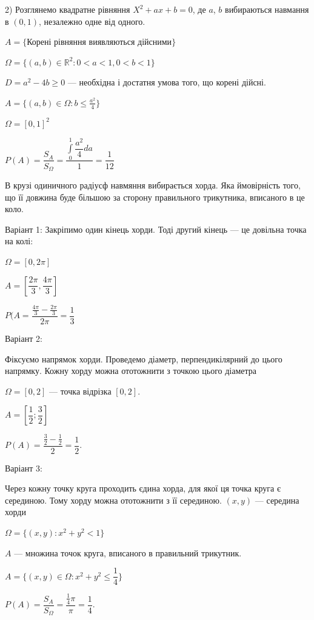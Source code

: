 2) Розглянемо квадратне рівняння $X^2 + ax + b = 0$, де $a$, $b$ вибираються
навмання в $(0, 1)$, незалежно одне від одного.

$A = \{$Корені рівняння виявляються дійсними$\}$

$\Omega = \{ (a, b) \in \mathbb{R}^2: 0 < a < 1, 0 < b < 1\}$

$D = a^2 - 4b \geqslant 0$ --- необхідна і достатня умова того, що корені дійсні.

$A = \{(a, b) \in \Omega: b \leqslant \frac{a^2}{4}\}$

\beautifulImage

$\Omega = [0, 1]^2$

$P(A) = \dfrac{S_A}{S_{\Omega}}
= \dfrac{\int\limits_0^1 \dfrac{a^2}{4}da}{1}
= \dfrac{1}{12}$

\begin{problem}    
    В крузі одиничного радіусф навмяння вибирається хорда.
    Яка ймовірність того, що її довжина буде більшою за 
    сторону правильного трикутника, вписаного в це коло.
\end{problem}
\begin{solution}
    Варіант 1: Закріпимо один кінець хорди. Тоді другий
    кінець --- це довільна точка на колі:

    \beautifulImage

    $\Omega = [0, 2\pi]$

    $A = [\dfrac{2\pi}{3}, \dfrac{4\pi}{3}]$

    \beautifulImage

    $P(A = \dfrac{\frac{4\pi}{3}-\frac{2\pi}{3}}{2\pi} =\dfrac{1}{3}$

    Варіант 2:
    
    \beautifulImage
    
    Фіксуємо напрямок хорди. Проведемо діаметр,
    перпендикілярний до цього напрямку. Кожну хорду можна
    ототожнити з точкою цього діаметра

    $\Omega = [0, 2]$ --- точка відрізка $[0, 2]$.

    $A = [\dfrac{1}{2}; \dfrac{3}{2}]$

    $P(A) = \dfrac{\frac{3}{2}-\frac{1}{2}}{2} = \dfrac{1}{2}$.

    Варіант 3:
    
    \beautifulImage

    Через кожну точку круга проходить єдина
    хорда, для якої ця точка круга є серединою. Тому хорду
    можна ототожнити з її серединою. $(x, y)$ --- середина хорди

    $\Omega = \{(x, y): x^2 + y^2 < 1\}$

    $A$ --- множина точок круга, вписаного в правильний трикутник.

    $A = \{(x, y) \in \Omega: x^2 + y^2 \leqslant \dfrac{1}{4}\}$

    $P(A) = \dfrac{S_A}{S_{\Omega}} = \dfrac{\frac{1}{4}\pi}{\pi} = \dfrac{1}{4}.$
\end{solution}


